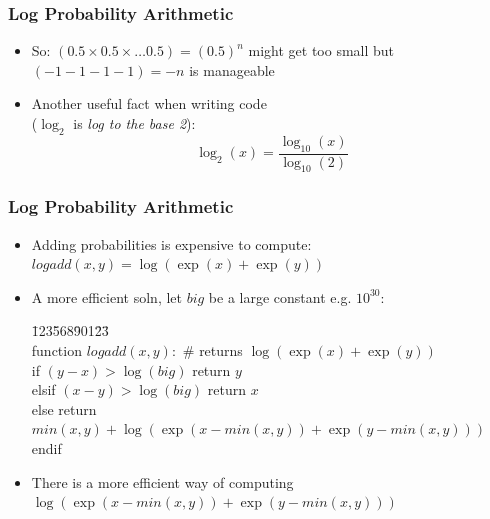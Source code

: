 \documentclass[handout]{beamer}
\begin{document}
\begin{frame}
\frametitle{Log Probability Arithmetic}
\begin{itemize}[<+->]
\item So: $(0.5 \times 0.5 \times \ldots 0.5) = (0.5)^n$ might get too
  small but $(- 1 - 1 - 1 - 1) = - n$ is manageable
\item Another useful fact when writing code \\
($\log_2$ is {\em log to the base 2}):
\[ \log_2(x) = \frac{\log_{10}(x)}{\log_{10}(2)} \]
\end{itemize}

\end{frame}

\begin{frame}
\frametitle{Log Probability Arithmetic}
\begin{itemize}[<+->]
\item Adding probabilities is expensive to compute: $logadd(x,y) = \log(\exp(x) + \exp(y))$
\item A more efficient soln, let $big$ be a large constant e.g. $10^{30}$:
\begin{tabbing}
\=123\=568\=901\=23\=\kill \\
\textsf{function } $logadd(x,y):$ {\color{red} \# returns $\log(\exp(x) + \exp(y))$} \\
\>  \textsf{if } $(y - x) > \log(big)$ \color{blue} \textsf{return } $y$ \\
\>  \textsf{elsif  } $(x - y) > \log(big)$ \color{blue} \textsf{return } $x$ \\
\>  \textsf{else } \color{blue} \textsf{return } \\
\>\>\> \color{blue} $min(x, y) + \log(\exp(x - min(x,y)) + \exp(y -
min(x,y)))$ \\
\>  \textsf{endif }
\end{tabbing}
\item There is a more efficient way of computing $\log(\exp(x - 
min(x,y)) + \exp(y - min(x,y)))$
\end{itemize}

\end{frame}
\end{document}

